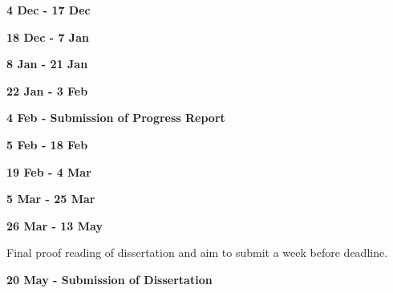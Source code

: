 \textbf{4 Dec - 17 Dec}


\textbf{18 Dec - 7 Jan}


\textbf{8 Jan - 21 Jan}

\textbf{22 Jan - 3 Feb}

\textbf{4 Feb - Submission of Progress Report}

\textbf{5 Feb - 18 Feb}


\textbf{19 Feb - 4 Mar}


\textbf{5 Mar - 25 Mar}


\textbf{26 Mar - 13 May}

Final proof reading of dissertation and aim to submit a week before deadline.

\textbf{20 May - Submission of Dissertation}
